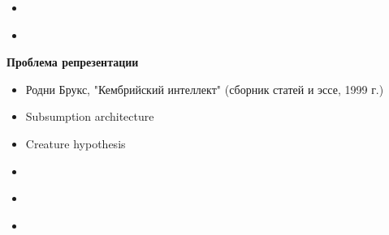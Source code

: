 \documentclass{beamer}
\begin{document}
\begin{frame}{}
\begin{itemize}
	\item 
	\medskip
\end{itemize}
\end{frame}

\begin{frame}{}
\begin{itemize}
	\item 
	\medskip
\end{itemize}
\end{frame}


%
%

\begin{frame}{}
\begin{center}
	\textbf{Проблема репрезентации}
\end{center}
\end{frame}

\begin{frame}{}
\begin{itemize}
	\item Родни Брукс, "Кембрийский интеллект" (сборник статей и эссе, 1999 г.)
	\medskip
	\item Subsumption architecture
	\medskip
	\item Creature hypothesis
\end{itemize}
\end{frame}

\begin{frame}{}
\begin{itemize}
	\item 
	\medskip
\end{itemize}
\end{frame}

\begin{frame}{}
\begin{itemize}
	\item 
	\medskip
\end{itemize}
\end{frame}

\begin{frame}{}
\begin{itemize}
	\item 
	\medskip
\end{itemize}
\end{frame}
\end{document}
